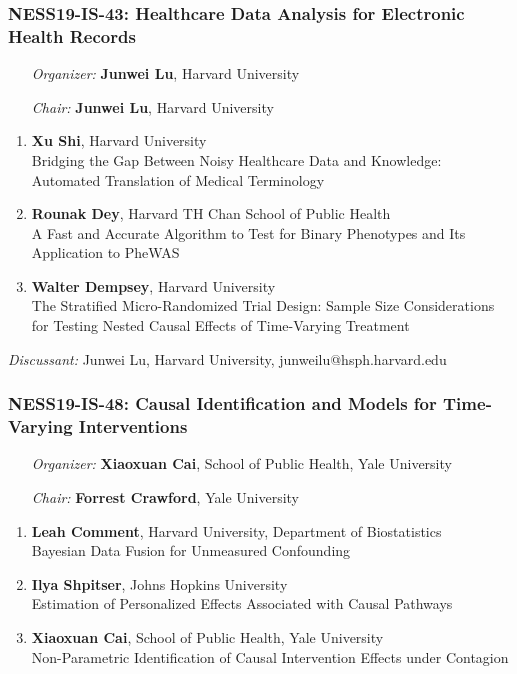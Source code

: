 \subsubsection*{NESS19-IS-43: Healthcare Data Analysis for Electronic Health Records}

\begin{enumerate}[align=left]
\item [\emph{Organizer:}] \textbf{Junwei Lu}, Harvard University
\item [\emph{Chair:}] \textbf{Junwei Lu}, Harvard University
\end{enumerate}

\begin{enumerate}
\item \textbf{Xu Shi}, Harvard University \\
Bridging the Gap Between Noisy Healthcare Data and Knowledge: Automated Translation of Medical Terminology
\item \textbf{Rounak Dey}, Harvard TH Chan School of Public Health \\
A Fast and Accurate Algorithm to Test for Binary Phenotypes and Its Application to PheWAS
\item \textbf{Walter Dempsey}, Harvard University \\
The Stratified Micro-Randomized Trial Design:  Sample Size Considerations for Testing Nested Causal Effects of Time-Varying Treatment
\end{enumerate}

\emph{Discussant:} Junwei Lu, Harvard University, junweilu@hsph.harvard.edu

\subsubsection*{NESS19-IS-48: Causal Identification and Models for Time-Varying Interventions}

\begin{enumerate}[align=left]
\item [\emph{Organizer:}] \textbf{Xiaoxuan Cai}, School of Public Health, Yale University
\item [\emph{Chair:}] \textbf{Forrest Crawford},  Yale University
\end{enumerate}

\begin{enumerate}
\item \textbf{Leah Comment}, Harvard University, Department of Biostatistics \\
Bayesian Data Fusion for Unmeasured Confounding
\item \textbf{Ilya Shpitser}, Johns Hopkins University \\
Estimation of Personalized Effects Associated with Causal Pathways
\item \textbf{Xiaoxuan Cai}, School of Public Health, Yale University \\
Non-Parametric Identification of Causal Intervention Effects under Contagion
\end{enumerate}

